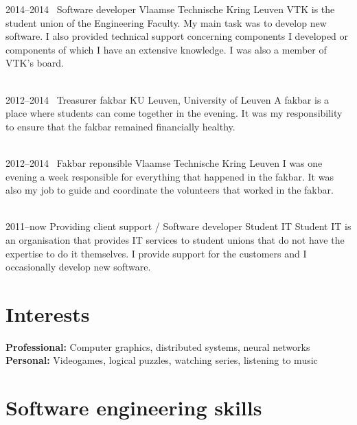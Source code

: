 \documentclass[a4paper]{friggeri-cv} %
\begin{document}
\begin{entrylist}
\entry
{2014--2014~}
{Software developer}
{Vlaamse Technische Kring Leuven}
{VTK is the student union of the Engineering Faculty. My main task was to develop new software. I also provided technical support concerning components I developed or components of which I have an extensive knowledge.
I was also a member of VTK’s board.\\
~}


\entry
{2012--2014~}
{Treasurer fakbar}
{KU Leuven, University of Leuven}
{A fakbar is a place where students can come together in the evening. It was my responsibility to ensure that the fakbar remained financially healthy.\\
~}


\entry
{2012--2014~}
{Fakbar reponsible}
{Vlaamse Technische Kring Leuven}
{I was one evening a week responsible for everything that happened in the fakbar. It was also my job to guide and coordinate the volunteers that worked in the fakbar.\\
~}


\entry
{2011--now}
{Providing client support / Software developer}
{Student IT}
{Student IT is an organisation that provides IT services to student unions that do not have the expertise to do it themselves. I provide support for the customers and I occasionally develop new software.}

\end{entrylist}



\section{Interests}

\textbf{Professional:} Computer graphics, distributed systems, neural networks\\
\textbf{Personal:} Videogames, logical puzzles, watching series, listening to music

\newpage
\addtolength{\oddsidemargin}{-1.7cm}
\addtolength{\evensidemargin}{-1.7cm}

\section{Software engineering skills}
\end{document}
